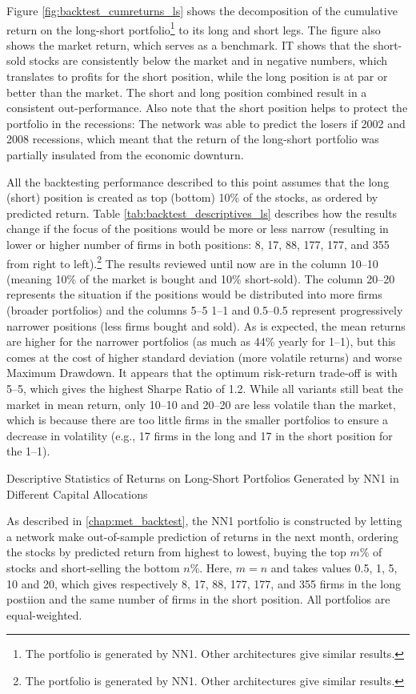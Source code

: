 		Figure \ref{fig:backtest_cumreturns_ls} shows the decomposition of the cumulative return on the long-short portfolio\footnote{The portfolio is generated by NN1. Other architectures give similar results.} to its long and short legs. The figure also shows the market return, which serves as a benchmark. IT shows that the short-sold stocks are consistently below the market and in negative numbers, which translates to profits for the short position, while the long position is at par or better than the market. The short and long position combined result in a consistent out-performance. Also note that the short position helps to protect the portfolio in the recessions: The network was able to predict the losers if 2002 and 2008 recessions, which meant that the return of the long-short portfolio was partially insulated from the economic downturn.     
		
		
		All the backtesting performance described to this point assumes that the long (short) position is created as top (bottom) 10\%  of the stocks, as ordered by predicted return. Table \ref{tab:backtest_descriptives_ls} describes how the results change if the focus of the positions would be more or less narrow (resulting in lower or higher number of firms in both positions: 8, 17, 88, 177, 177, and 355 from right to left).\footnote{The portfolio is generated by NN1. Other architectures give similar results.} The results reviewed until now are in the column 10--10 (meaning 10\% of the market is bought and 10\% short-sold). The column 20--20 represents the situation if the positions would be distributed into more firms (broader portfolios) and the columns 5--5 1--1 and 0.5--0.5 represent progressively narrower positions (less firms bought and sold). As is expected, the mean returns are higher for the narrower portfolios (as much as 44\% yearly for 1--1), but this comes at the cost of higher standard deviation (more volatile returns) and worse Maximum Drawdown. It appears that the optimum risk-return trade-off is with 5--5, which gives the highest Sharpe Ratio of 1.2. While all variants still beat the market in mean return, only 10--10 and 20--20 are less volatile than the market, which is because there are too little firms in the smaller portfolios  to ensure a decrease in volatility (e.g., 17 firms in the long and 17 in the short position for the 1--1).
		
		\begin{table}
			\centering
			
			\caption{Descriptive Statistics of Returns on Long-Short Portfolios Generated by NN1 in Different Capital Allocations}
			\label{tab:backtest_descriptives_ls}
			\medskip 
			\small 
			As described in \ref{chap:met_backtest}, the NN1 portfolio is constructed by letting a network make out-of-sample prediction of returns in the next month, ordering the stocks by predicted return from highest to lowest, buying the top $m$\% of stocks and short-selling the bottom $n$\%. Here, $m=n$ and takes values 0.5, 1, 5, 10 and 20, which gives respectively 8, 17, 88, 177, 177, and 355 firms in the long postiion and the same number of firms in the short position. All portfolios are equal-weighted. 
		\end{table}

